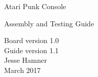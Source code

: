 \documentclass[12pt]{article}
\newcommand{\+}{\item}		%
\newcommand{\revision}{1.0}
\newif\ifkey
\begin{document}
\thispagestyle{empty}
\begin{center}
\begin{Huge}
Atari Punk Console\\
\end{Huge}
\bigskip
\begin{Large}
\ifkey
Assembly, Testing, and Designer's Guide\\
\else
Assembly and Testing Guide\\
\fi

\end{Large}
\bigskip
Board version \revision\\
Guide version 1.1\\
Jesse Hamner\\
March 2017\\
\vspace{0.2in}


\end{center}

\tableofcontents

\vfill 
\end{document}
